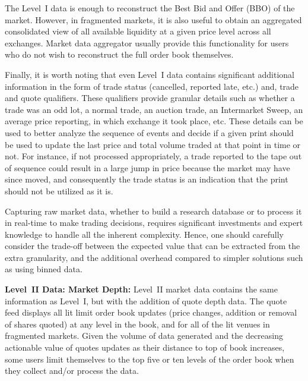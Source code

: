 The Level~I data is enough to reconstruct the Best Bid and Offer (BBO) of the market. However, in fragmented markets,\label{in:fragmented} it is also useful to obtain an aggregated consolidated view of all available liquidity at a given price level across all exchanges. Market data aggregator usually provide this functionality for users who do not wish to reconstruct the full order book themselves. 


Finally, it is worth noting that even Level~I data contains significant additional information in the form of trade status (cancelled, reported late, etc.) and, trade and quote qualifiers. These qualifiers provide granular details such as whether a trade was an odd lot, a normal trade, an auction trade, an Intermarket Sweep, an average price reporting, in which exchange it took place, etc. These details can be used to better analyze the sequence of events and decide if a given print should be used to update the last price and total volume traded at that point in time or not. For instance, if not processed appropriately, a trade reported to the tape out of sequence could result in a large jump in price because the market may have since moved, and consequently the trade status is an indication that the print should not be utilized as it is.


Capturing raw market data, whether to build a research database or to process it in real-time to make trading decisions, requires significant investments and expert knowledge to handle all the inherent complexity. Hence, one should carefully consider the trade-off between the expected value that can be extracted from the extra granularity, and the additional overhead compared to simpler solutions such as using binned data. \twomedskip


\noindent\textbf{Level~II Data: Market Depth:}  Level~II market data contains the same information as Level~I, but with the addition of quote depth data. The quote feed displays all lit limit order book updates (price changes, addition or removal of shares quoted) at any level in the book, and for all of the lit venues in fragmented markets. Given the volume of data generated and the decreasing actionable value of quotes updates as their distance to top of book increases, some users limit themselves to the top five or ten levels of the order book  when they collect and/or process the data. \label{in:level2dat1} \twomedskip


